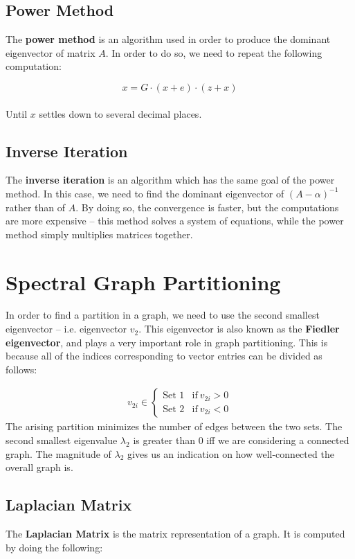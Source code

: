 \documentclass{article}
\begin{document}
\subsection{Power Method}
The \textbf{power method} is an algorithm used in order to produce the dominant eigenvector of matrix $A$. In order to do so, we need to repeat the following computation:

\[ x = G \cdot (x + e) \cdot (z + x) \] \\
Until $x$ settles down to several decimal places.

\subsection{Inverse Iteration}
The \textbf{inverse iteration} is an algorithm which has the same goal of the power method. In this case, we need to find the dominant eigenvector of $(A - \alpha)^{-1}$ rather than of $A$. By doing so, the convergence is faster, but the computations are more expensive -- this method solves a system of equations, while the power method simply multiplies matrices together.

\section{Spectral Graph Partitioning}
In order to find a partition in a graph, we need to use the second smallest eigenvector -- i.e. eigenvector $v_2$. This eigenvector is also known as the \textbf{Fiedler eigenvector}, and plays a very important role in graph partitioning. This is because all of the indices corresponding to vector entries can be divided as follows:

\begin{align*}
	v_{2i} \in \begin{cases} \text{Set 1} & \text{if}~ v_{2i} > 0 \\ \text{Set 2} & \text{if}~ v_{2i} < 0 \end{cases}
\end{align*}
The arising partition minimizes the number of edges between the two sets. The second smallest eigenvalue $\lambda_2$ is greater than 0 iff we are considering a connected graph. The magnitude of $\lambda_2$ gives us an indication on how well-connected the overall graph is.

\subsection{Laplacian Matrix}
The \textbf{Laplacian Matrix} is the matrix representation of a graph. It is computed by doing the following:
\end{document}
